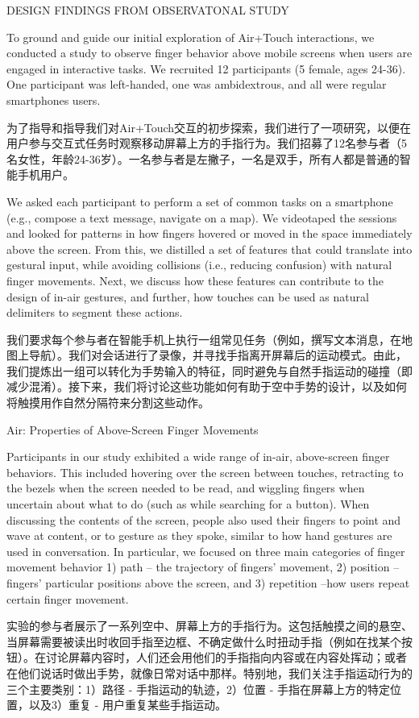 DESIGN FINDINGS FROM OBSERVATONAL STUDY

To ground and guide our initial exploration of Air+Touch interactions, we conducted a study to observe finger behavior above mobile screens when users are engaged in interactive tasks. We recruited 12 participants (5 female, ages 24-36). One participant was left-handed, one was ambidextrous, and all were regular smartphones users.  


为了指导和指导我们对Air+Touch交互的初步探索，我们进行了一项研究，以便在用户参与交互式任务时观察移动屏幕上方的手指行为。我们招募了12名参与者（5名女性，年龄24-36岁）。一名参与者是左撇子，一名是双手，所有人都是普通的智能手机用户。

We asked each participant to perform a set of common tasks on a smartphone (e.g., compose a text message, navigate on a map). We videotaped the sessions and looked for patterns in how fingers hovered or moved in the space immediately above the screen. From this, we distilled a set of features that could translate into gestural input, while avoiding collisions (i.e., reducing confusion) with natural finger movements. Next, we discuss how these features can contribute to the design of in-air gestures, and further, how touches can be used as natural delimiters to segment these actions.  

我们要求每个参与者在智能手机上执行一组常见任务（例如，撰写文本消息，在地图上导航）。我们对会话进行了录像，并寻找手指离开屏幕后的运动模式。由此，我们提炼出一组可以转化为手势输入的特征，同时避免与自然手指运动的碰撞（即减少混淆）。接下来，我们将讨论这些功能如何有助于空中手势的设计，以及如何将触摸用作自然分隔符来分割这些动作。

Air: Properties of Above-Screen Finger Movements 

Participants in our study exhibited a wide range of in-air, above-screen finger behaviors. This included hovering over the screen between touches, retracting to the bezels when the screen needed to be read, and wiggling fingers when uncertain about what to do (such as while searching for a button). When discussing the contents of the screen, people also used their fingers to point and wave at content, or to gesture as they spoke, similar to how hand gestures are used in conversation. In particular, we focused on three main categories of finger movement behavior 1) path – the trajectory of fingers’ movement, 2) position – fingers’ particular positions above the screen, and 3) repetition –how users repeat certain finger movement. 

实验的参与者展示了一系列空中、屏幕上方的手指行为。这包括触摸之间的悬空、当屏幕需要被读出时收回手指至边框、不确定做什么时扭动手指（例如在找某个按钮）。在讨论屏幕内容时，人们还会用他们的手指指向内容或在内容处挥动；或者在他们说话时做出手势，就像日常对话中那样。特别地，我们关注手指运动行为的三个主要类别：1）路径 - 手指运动的轨迹，2）位置 - 手指在屏幕上方的特定位置，以及3）重复 - 用户重复某些手指运动。

